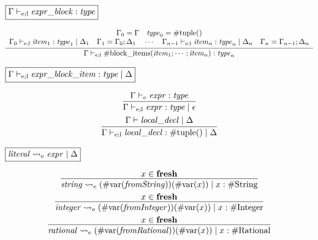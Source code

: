 $\fbox{$\Gamma \vdash_{\mathrm{e}; \mathrm{l}} \mathit{expr\_block}: \mathit{type}$}$

\begin{gather*}
    \infer{\Gamma \vdash_{\mathrm{e}; \mathrm{l}} \mathrm{\#block\_items}(\mathit{item}_1; \cdots; \mathit{item}_n): \mathit{type}_n}{
        \begin{array}{c}
            \Gamma_0 = \Gamma
            \hspace{1em}
            \mathit{type}_0 = \mathrm{\#tuple}()
            \\
            \Gamma_0 \vdash_{\mathrm{e}; \mathrm{l}} \mathit{item}_1: \mathit{type}_1 \mid \Delta_1
            \hspace{1em}
            \Gamma_1 = \Gamma_0; \Delta_1
            \hspace{1em}
            \cdots
            \hspace{1em}
            \Gamma_{n - 1} \vdash_{\mathrm{e}; \mathrm{l}} \mathit{item}_n: \mathit{type}_n \mid \Delta_n
            \hspace{1em}
            \Gamma_n = \Gamma_{n - 1}; \Delta_n
        \end{array}
    }
\end{gather*}

$\fbox{$\Gamma \vdash_{\mathrm{e}; \mathrm{l}} \mathit{expr\_block\_item}: \mathit{type} \mid \Delta$}$

\begin{gather*}
    \infer{\Gamma \vdash_{\mathrm{e}; \mathrm{l}} \mathit{expr}: \mathit{type} \mid \epsilon}{
        \Gamma \vdash_\mathrm{e} \mathit{expr}: \mathit{type}
    }
    \\
    \infer{\Gamma \vdash_{\mathrm{e}; \mathrm{l}} \mathit{local\_decl}: \mathrm{\#tuple}() \mid \Delta}{
        \Gamma \vdash \mathit{local\_decl} \mid \Delta
    }
\end{gather*}

$\fbox{$\mathit{literal} \rightsquigarrow_\mathrm{e} \mathit{expr} \mid \Delta$}$

\begin{gather*}
    \infer{\mathit{string} \rightsquigarrow_\mathrm{e} (\mathrm{\#var}(\mathit{fromString}))(\mathrm{\#var}(x)) \mid x: \mathrm{\#String}}{
        x \in \mathbf{fresh}
    }
    \\
    \infer{\mathit{integer} \rightsquigarrow_\mathrm{e} (\mathrm{\#var}(\mathit{fromInteger}))(\mathrm{\#var}(x)) \mid x: \mathrm{\#Integer}}{
        x \in \mathbf{fresh}
    }
    \\
    \infer{\mathit{rational} \rightsquigarrow_\mathrm{e} (\mathrm{\#var}(\mathit{fromRational}))(\mathrm{\#var}(x)) \mid x: \mathrm{\#Rational}}{
        x \in \mathbf{fresh}
    }
\end{gather*}

